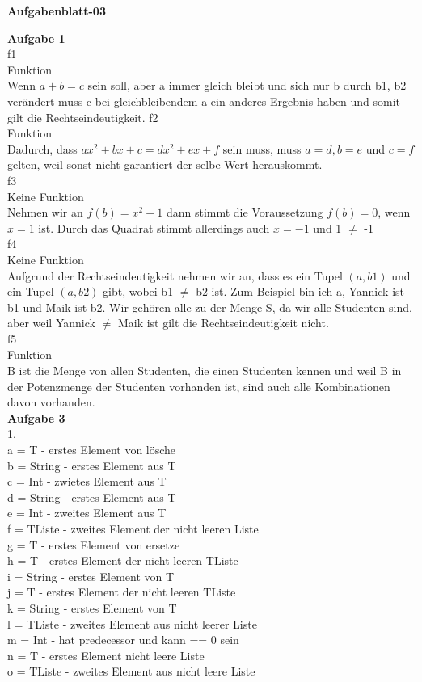 \documentclass[a4paper, 12pt, ngerman]{article}
\begin{document}
	\begin {center}
	\textbf{Aufgabenblatt-03}
	\end {center}


\noindent \textbf{Aufgabe 1}\\
f1\\
Funktion\\
Wenn $a+b=c$ sein soll, aber a immer gleich bleibt und sich nur b  durch b1, 
b2 verändert muss c bei gleichbleibendem a ein anderes Ergebnis haben und 
somit gilt die Rechtseindeutigkeit.
f2\\
Funktion\\
Dadurch, dass $ax^2 + bx + c = dx^2 + ex + f$ sein muss, muss $a=d, b=e$ und 
$c=f$ gelten, weil sonst nicht garantiert der selbe Wert herauskommt.\\
f3\\
Keine Funktion\\
Nehmen wir an $f(b) = x^2 -1$ dann stimmt die Voraussetzung $f(b) = 0$, 
wenn $x = 1$ ist. Durch das Quadrat stimmt allerdings auch $x = -1$ und 1 $\neq$ -1\\
f4\\
Keine Funktion\\
Aufgrund der Rechtseindeutigkeit nehmen wir an, dass es ein Tupel $(a,b1)$ 
und ein Tupel $(a,b2)$ gibt, wobei b1 $\neq$ b2 ist. Zum Beispiel bin ich a, Yannick
ist b1 und Maik ist b2. Wir gehören alle zu der Menge S, da wir alle Studenten
sind, aber weil Yannick $\neq$ Maik ist gilt die Rechtseindeutigkeit nicht.\\
f5\\
Funktion\\
B ist die Menge von allen Studenten, die einen Studenten kennen und weil B in der 
Potenzmenge der Studenten vorhanden ist, sind auch alle Kombinationen davon vorhanden.\\

\noindent \textbf{Aufgabe 3}\\
1.\\
a = T - erstes Element von lösche\\
b = String - erstes Element aus T\\
c = Int - zwietes Element aus T\\
d = String - erstes Element aus T\\
e = Int - zweites Element aus T\\
f = TListe - zweites Element der nicht leeren Liste\\
g = T - erstes Element von ersetze\\
h = T - erstes Element der nicht leeren TListe\\
i = String - erstes Element von T\\
j = T - erstes Element der nicht leeren TListe\\
k = String - erstes Element von T\\
l = TListe - zweites Element aus nicht leerer Liste\\
m = Int - hat predecessor und kann == 0 sein\\
n = T - erstes Element nicht leere Liste\\
o = TListe - zweites Element aus nicht leere Liste\\
\end{document}
